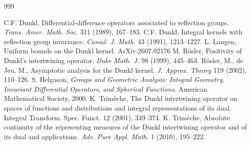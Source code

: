 \documentclass[reqno]{amsart}
\theoremstyle{plain}
\theoremstyle{definition}
\theoremstyle{remark}
\numberwithin{equation}{section}
\begin{document}
  
 
 
\begin{thebibliography}{999}

 C.F. Dunkl, Differential-difference operators
associated to reflection groups. \emph{Trans. Amer. Math. Soc.} 311 (1989), 167--183.
  C.F. Dunkl, Integral kernels with reflection group 
invariance. \emph{Canad. J. Math.} 43 (1991), 1213--1227.
 L. Langen, Uniform bounds on the Dunkl kernel. ArXiv:2607.02176
 M. R\"osler, Positivity of Dunkl's intertwining
  operator. \emph{Duke Math. J.} 98 (1999), 445--463.
  R\"osler, M., de Jeu, M., Asymptotic analysis for the Dunkl kernel.
  \emph{J. Approx. Theory} 119 (2002), 110--126.
   S. Helgason, \emph{Groups and Geometric Analysis: Integral Geometry, Invariant Differential Operators, and Spherical Functions.} American Mathematical Society, 2000. 
   K. Trim\`eche, The Dunkl intertwining operator on spaces of functions and distributions and integral representations of its dual. Integral Transform. Spec. Funct. 12 (2001), 349--374.
     K. Trim\`eche, Absolute continuity of the representing measures of the Dunkl intertwining operator and of its dual and applications. \emph{Adv. Pure Appl. Math. } 1 (2010), 195--222. 



  
\end{thebibliography}
\end{document}
